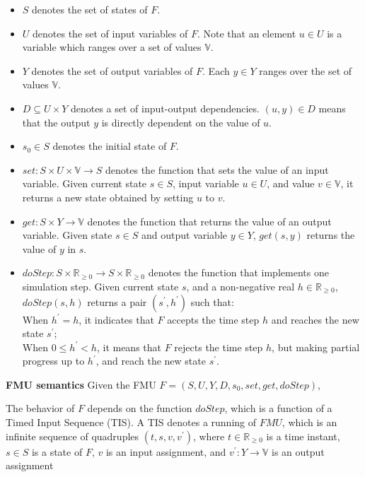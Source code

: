 \begin{itemize}
\item
$S$ denotes the set of states of $F$. 
\item
$U$ denotes the set of input variables of $F$. Note that an element $u \in U$ is a variable which ranges over a set of values $\mathbb{V}$. 
\item
$Y$ denotes the set of output variables of $F$. Each $y \in Y$ ranges over the set of values $\mathbb{V}$.
\item
$D \subseteq U \times Y$ denotes a set of input-output dependencies. $(u,y) \in D $ means that the output $y$ is directly dependent on the value of $u$. 
\item
$s_{0} \in S$ denotes the initial state of $F$.
\item
$set : S \times U \times \mathbb{V} \rightarrow S$ denotes the function that sets the value of an input variable. Given current state $s \in S$, input variable $u \in U$, and value $v \in \mathbb{V}$, it returns a new state obtained by setting $u$ to $v$.
\item
$get : S \times Y \rightarrow \mathbb{V}$ denotes the function that returns the value of an output variable. Given state $s \in S$ and output variable $y \in Y$, $get(s,y)$ returns the value of $y$ in $s$.
\item
$doStep : S \times \mathbb{R}_{\geqslant{0}} \rightarrow S \times \mathbb{R}_{\geqslant{0}}$ denotes the function that implements one simulation step. Given current state $s$, and a non-negative real $h \in \mathbb{R}_{\geqslant{0}}$, $doStep(s,h)$ returns a pair $(s^{\prime},h^{\prime})$ such that:
\\
When $h^{\prime} = h$, it indicates that $F$ accepts the time step $h$ and reaches the new state $s^{\prime}$;
\\
When $0 \leqslant h^{\prime} < h$, it means that $F$ rejects the time step $h$, but making partial progress up to $h^{\prime}$, and reach the new state $s^{\prime}$.
\end{itemize}
\begin{definition}
\textbf{FMU semantics}
Given the FMU $F=(S,U,Y,D,s_{0},set,get,doStep)$,
\end{definition} 
The behavior of $F$ depends on the function $doStep$, which is a function of a Timed Input Sequence (TIS).
A TIS denotes a running of $FMU$, which is an infinite sequence of quadruples $(t,s,v,v^{\prime})$, where $t \in \mathbb{R}_{\geqslant{0}}$ is a time instant, $s \in S$ is a state of $F$, $v$ is an input assignment, and $v^{\prime} : Y \rightarrow \mathbb{V}$ is an output assignment
 
